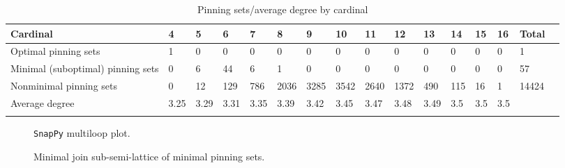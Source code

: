 \documentclass{article}%
\begin{document}
\begin{table}[ht]
	\caption{Pinning sets/average degree by cardinal}
	\centering
	\renewcommand{\arraystretch}{1.5}
	\begin{tabularx}{\textwidth}{lXXXXXXXXXXXXXXX}
		\toprule
			Cardinal & 4 & 5 & 6 & 7 & 8 & 9 & 10 & 11 & 12 & 13 & 14 & 15 & 16 & Total\\
			\hline
			Optimal pinning sets & 1 & 0 & 0 & 0 & 0 & 0 & 0 & 0 & 0 & 0 & 0 & 0 & 0 & 1 \\
			Minimal (suboptimal) pinning sets & 0 & 6 & 44 & 6 & 1 & 0 & 0 & 0 & 0 & 0 & 0 & 0 & 0 & 57 \\
			Nonminimal pinning sets & 0 & 12 & 129 & 786 & 2036 & 3285 & 3542 & 2640 & 1372 & 490 & 115 & 16 & 1 & 14424 \\
			Average degree & 3.25 & 3.29 & 3.31 & 3.35 & 3.39 & 3.42 & 3.45 & 3.47 & 3.48 & 3.49 & 3.5 & 3.5 & 3.5 &  \\
		\bottomrule \\ 
	\end{tabularx}
\end{table}

\begin{multicols}{2}
\begin{figure}[H]
\centering

\caption{\texttt{SnapPy} multiloop plot.}
\label{fig:tex/img/[[21, 28, 22, 1], [13, 20, 14, 21], [10, 27, 11, 28], [22, 11, 23, 12], [1, 12, 2, 13], [8, 19, 9, 20], [14, 9, 15, 10], [15, 26, 16, 27], [23, 6, 24, 7], [2, 7, 3, 8], [3, 18, 4, 19], [4, 25, 5, 26],.svg}
\end{figure}
\columnbreak

\begin{figure}[H]
\centering
\scalebox{0.8}{}
\caption{Minimal join sub-semi-lattice of minimal pinning sets.}
\label{fig:tex/img/[[21, 28, 22, 1], [13, 20, 14, 21], [10, 27, 11, 28], [22, 11, 23, 12], [1, 12, 2, 13], [8, 19, 9, 20], [14, 9, 15, 10], [15, 26, 16, 27], [23, 6, 24, 7], [2, 7, 3, 8], [3, 18, 4, 19], [4, 25, 5, 26],.pgf}
\end{figure}
\end{multicols}
\end{document}
